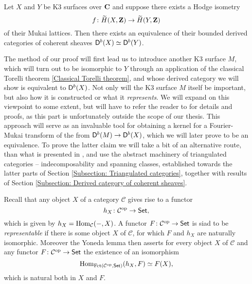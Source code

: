 \begin{proposition}
    \label{Hodge isometry implies D equivalence}
    Let $X$ and $Y$ be K3 surfaces over $\mathbf C$ and suppose there exists a Hodge isometry 
    \[
        f \colon \widetilde{H}(X, \mathbf Z) \to \widetilde{H}(Y, \mathbf Z)
    \]
    of their Mukai lattices. Then there exists an equivalence of their bounded derived categories of coherent sheaves $\mathsf{D}^b(X) \simeq \mathsf{D}^b(Y)$.
\end{proposition}
The method of our proof will first lead us to introduce another K3 surface $M$, which will turn out to be isomorphic to $Y$ through an application of the classical Torelli theorem \ref{Classical Torelli theorem}, and whose derived category we will show is equivalent to $\mathsf{D}^b(X)$. Not only will the K3 surface $M$ itself be important, but also how it is constructed or what it \emph{represents}. We will expand on this viewpoint to some extent, but will have to refer the reader to \cite[text]{keylist} for details and proofs, as this part is unfortunately outside the scope of our thesis. This approach will serve as an invaluable tool for obtaining a kernel for a Fourier-Mukai transform of the from $\mathsf{D}^b(M) \to \mathsf{D}^b(X)$, which we will later prove to be an equivalence. To prove the latter claim we will take a bit of an alternative route, than what is presented in \cite{Orlov-K3}, and use the abstract machinery of triangulated categories -- indecomposability and spanning classes, established towards the latter parts of Section \ref{Subsection: Triangulated categories}, together with results of Section \ref{Subsection: Derived category of coherent sheaves}. 




Recall that any object $X$ of a category $\mathcal C$ gives rise to a functor 
\[
    h_X \colon \mathcal C^{\text{op}} \to \mathsf{Set},
\]
which is given by $h_X = \operatorname{Hom}_{\mathcal C}(-, X)$. A functor $F \colon \mathcal C^{\text{op}} \to \mathsf{Set}$ is siad to be \emph{representable} if there is some object $X$ of $\mathcal C$, for which $F$ and $h_X$ are naturally isomorphic. Moreover the Yoneda lemma \cite[text]{keylist} then asserts for every object $X$ of $\mathcal C$ and any functor $F \colon \mathcal C ^{\text{op}} \to \mathsf{Set}$ the existence of an isomorphism 
\begin{equation}
    \label{eq: nat iso of Yoneda}
    \operatorname{Hom}_{\operatorname{Fct(\mathcal C^{\text{op}}, \mathsf{Set})}}(h_X, F) \simeq F(X),
\end{equation}
which is natural both in $X$ and $F$.

